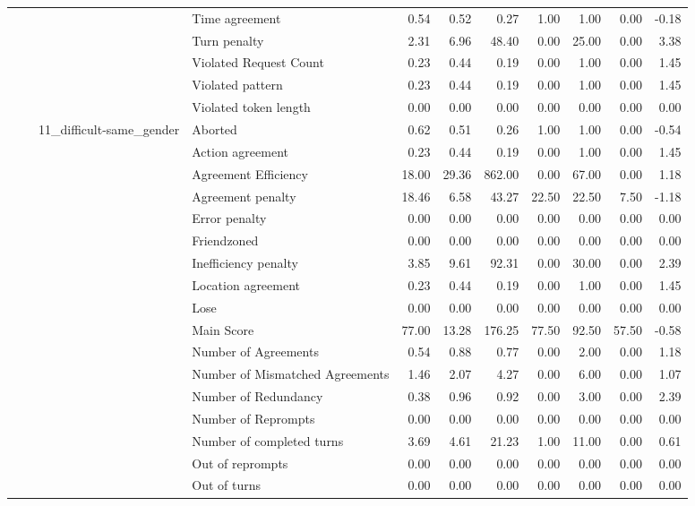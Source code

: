 \begin{tabular}{llllrrrrrrr}
 &  &  & Time agreement & 0.54 & 0.52 & 0.27 & 1.00 & 1.00 & 0.00 & -0.18 \\
 &  &  & Turn penalty & 2.31 & 6.96 & 48.40 & 0.00 & 25.00 & 0.00 & 3.38 \\
 &  &  & Violated Request Count & 0.23 & 0.44 & 0.19 & 0.00 & 1.00 & 0.00 & 1.45 \\
 &  &  & Violated pattern & 0.23 & 0.44 & 0.19 & 0.00 & 1.00 & 0.00 & 1.45 \\
 &  &  & Violated token length & 0.00 & 0.00 & 0.00 & 0.00 & 0.00 & 0.00 & 0.00 \\
\cline{3-11}
 &  & \multirow[t]{27}{*}{11_difficult-same_gender} & Aborted & 0.62 & 0.51 & 0.26 & 1.00 & 1.00 & 0.00 & -0.54 \\
 &  &  & Action agreement & 0.23 & 0.44 & 0.19 & 0.00 & 1.00 & 0.00 & 1.45 \\
 &  &  & Agreement Efficiency & 18.00 & 29.36 & 862.00 & 0.00 & 67.00 & 0.00 & 1.18 \\
 &  &  & Agreement penalty & 18.46 & 6.58 & 43.27 & 22.50 & 22.50 & 7.50 & -1.18 \\
 &  &  & Error penalty & 0.00 & 0.00 & 0.00 & 0.00 & 0.00 & 0.00 & 0.00 \\
 &  &  & Friendzoned & 0.00 & 0.00 & 0.00 & 0.00 & 0.00 & 0.00 & 0.00 \\
 &  &  & Inefficiency penalty & 3.85 & 9.61 & 92.31 & 0.00 & 30.00 & 0.00 & 2.39 \\
 &  &  & Location agreement & 0.23 & 0.44 & 0.19 & 0.00 & 1.00 & 0.00 & 1.45 \\
 &  &  & Lose & 0.00 & 0.00 & 0.00 & 0.00 & 0.00 & 0.00 & 0.00 \\
 &  &  & Main Score & 77.00 & 13.28 & 176.25 & 77.50 & 92.50 & 57.50 & -0.58 \\
 &  &  & Number of Agreements & 0.54 & 0.88 & 0.77 & 0.00 & 2.00 & 0.00 & 1.18 \\
 &  &  & Number of Mismatched Agreements & 1.46 & 2.07 & 4.27 & 0.00 & 6.00 & 0.00 & 1.07 \\
 &  &  & Number of Redundancy & 0.38 & 0.96 & 0.92 & 0.00 & 3.00 & 0.00 & 2.39 \\
 &  &  & Number of Reprompts & 0.00 & 0.00 & 0.00 & 0.00 & 0.00 & 0.00 & 0.00 \\
 &  &  & Number of completed turns & 3.69 & 4.61 & 21.23 & 1.00 & 11.00 & 0.00 & 0.61 \\
 &  &  & Out of reprompts & 0.00 & 0.00 & 0.00 & 0.00 & 0.00 & 0.00 & 0.00 \\
 &  &  & Out of turns & 0.00 & 0.00 & 0.00 & 0.00 & 0.00 & 0.00 & 0.00 \\

\end{tabular}
